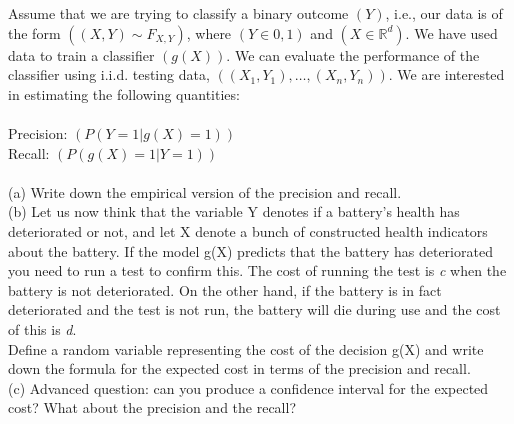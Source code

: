 \documentclass[12pt]{article}
\newenvironment{exercise}[2][Exercise]{\begin{trivlist}
\item[\hskip \labelsep {\bfseries #1}\hskip \labelsep {\bfseries #2.}]}{\end{trivlist}}
\begin{document}
\begin{exercise}{2}
Assume that we are trying to classify a binary outcome $( Y )$, i.e., our data is of the form $( (X, Y) \sim F_{X,Y} )$, where $( Y \in {0, 1} )$ and $( X \in \mathbb{R}^d )$. We have used data to train a classifier $( g(X) )$. We can evaluate the performance of the classifier using i.i.d. testing data, $( (X_1, Y_1), \ldots, (X_n, Y_n) )$. We are interested in estimating the following quantities:\\\\
Precision: $( P(Y = 1 | g(X) = 1) )$\\
Recall: $( P(g(X) = 1 | Y = 1) )$\\\\
(a) Write down the empirical version of the precision and recall.\\
(b) Let us now think that the variable Y denotes if a battery’s health
has deteriorated or not, and let X denote a bunch of constructed
health indicators about the battery. If the model g(X) predicts
that the battery has deteriorated you need to run a test to confirm
this. The cost of running the test is \textit{c} when the battery is
not deteriorated. On the other hand, if the battery is in fact deteriorated
and the test is not run, the battery will die during use
and the cost of this is \textit{d}. \\
Define a random variable representing the cost of the decision g(X) and write down the formula for the
expected cost in terms of the precision and recall.\\
(c) Advanced question: can you produce a confidence interval for the
expected cost? What about the precision and the recall?
\end{exercise}
\end{document}
